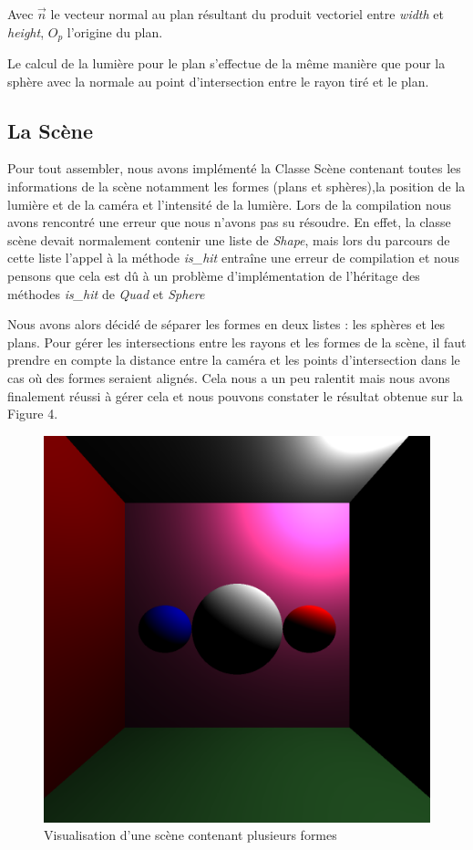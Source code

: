 \documentclass[11pt, oneside]{article}   	%
\begin{document}
Avec $\vec{n}$ le vecteur normal au plan résultant du produit vectoriel entre \textit{width} et \textit{height}, $O_p$ l'origine du plan.

Le calcul de la lumière pour le plan s'effectue de la même manière que pour la sphère avec la normale au point d'intersection entre le rayon tiré et le plan.

\subsection{La Scène}
Pour tout assembler, nous avons implémenté la Classe Scène contenant toutes les informations de la scène notamment les formes (plans et sphères),la position de la lumière et de la caméra et l'intensité de la lumière.
Lors de la compilation nous avons rencontré une erreur que nous n'avons pas su résoudre. En effet, la classe scène devait normalement contenir une liste de \textit{Shape}, mais lors du parcours de cette liste l'appel à la méthode \textit{is\_hit} entraîne une erreur de compilation et nous pensons que cela est dû à un problème d'implémentation de l'héritage des méthodes \textit{is\_hit} de \textit{Quad} et \textit{Sphere}

Nous avons alors décidé de séparer les formes en deux listes : les sphères et les plans. Pour gérer les intersections entre les rayons et les formes de la scène, il faut prendre en compte la distance entre la caméra et les points d'intersection dans le cas où des formes seraient alignés. Cela nous a un peu ralentit mais nous avons finalement réussi à gérer cela et nous pouvons constater le résultat obtenue sur la Figure 4.

\begin{figure}
    \centering
    \includegraphics[scale=0.2]{rapport/result 3.png}
    \caption{Visualisation d'une scène contenant plusieurs formes}
    \label{fig:my_label}
\end{figure}
\end{document}
